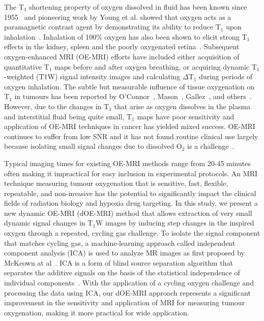 The T$_1$ shortening property of oxygen dissolved in fluid has been known since 1955~\cite{Chiarotti:1955kf} and pioneering work by Young et al. showed that oxygen acts as a paramagnetic contrast agent by demonstrating its ability to reduce T$_1$ upon inhalation~\cite{Young:1981vf}. 
Inhalation of 100\% oxygen has also been shown to elicit strong T$_1$ effects in the kidney\cite{Jones:2002dh}, spleen\cite{Tadamura:1997vc} and the poorly oxygenated retina~\cite{Berkowitz:2001uz}. 
Subsequent oxygen-enhanced MRI (OE-MRI) efforts have included either acquisition of quantitative T$_1$ maps before and after oxygen breathing, or acquiring dynamic T$_1$-weighted (T1W) signal intensity images and calculating $\Delta$T$_1$ during periods of oxygen inhalation.
The subtle but measurable influence of tissue oxygenation on T$_1$ in tumours has been reported by O'Connor~\cite{OConnor:2016ee,OConnor:2009ku,OConnor:2009bp,Little:2018iu}, Mason~\cite{Zhao:2015ez,White:2016fz,Hallac:2014cb}, Gallez~\cite{Jordan:2012do}, and others~\cite{Tadamura:1997vc,McGrath:2008kx,Kershaw:2010ha,Linnik:2013hf}. 
However, due to the changes in T$_1$ that arise as oxygen dissolves in the plasma and interstitial fluid being quite small, T$_1$ maps have poor sensitivity and application of OE-MRI techniques in cancer has yielded mixed success.
OE-MRI continues to suffer from low SNR and it has not found routine clinical use largely because isolating small signal changes due to dissolved O$_2$ is a challenge~\cite{OConnor:2016ee, Zhao:2015ez}.

Typical imaging times for existing OE-MRI methods range from 20-45 minutes often making it impractical for easy inclusion in experimental protocols. 
An MRI technique measuring tumour oxygenation that is sensitive, fast, flexible, repeatable, and non-invasive has the potential to significantly impact the clinical fields of radiation biology and hypoxia drug targeting.
In this study, we present a new dynamic OE-MRI (dOE-MRI) method that allows extraction of very small dynamic signal changes in T$_1$W images by inducing step changes in the inspired oxygen through a repeated, cycling gas challenge.
To isolate the signal component that matches cycling gas, a machine-learning approach called independent component analysis (ICA) is used to analyze MR images as first proposed by McKeown at al~\cite{McKeown:1998wo}.
ICA is a form of blind source separation algorithm that separates the additive signals on the basis of the statistical independence of individual components~\cite{Hyvarinen:2000vk}.
With the application of a cycling oxygen challenge and processing the data using ICA, our dOE-MRI approach represents a significant improvement in the sensitivity and application of MRI for measuring tumour oxygenation, making it more practical for wide application.
